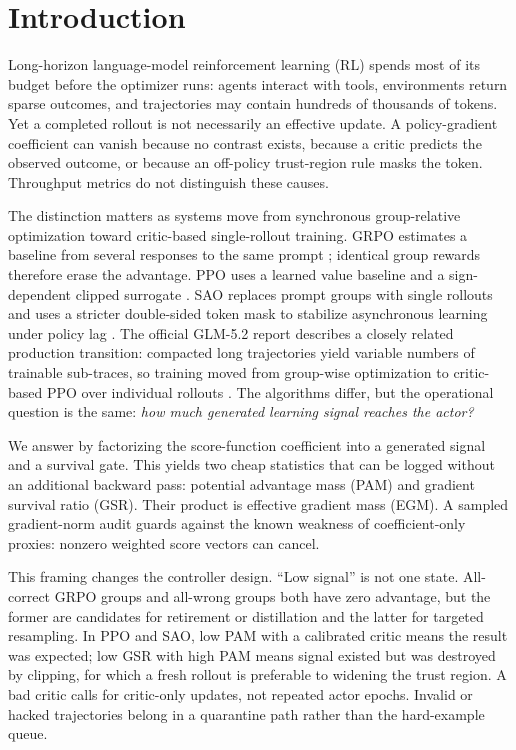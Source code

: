 \documentclass{article}
\begin{document}
\section{Introduction}

Long-horizon language-model reinforcement learning (RL) spends most of its
budget before the optimizer runs: agents interact with tools, environments
return sparse outcomes, and trajectories may contain hundreds of thousands of
tokens.  Yet a completed rollout is not necessarily an effective update.  A
policy-gradient coefficient can vanish because no contrast exists, because a
critic predicts the observed outcome, or because an off-policy trust-region
rule masks the token.  Throughput metrics do not distinguish these causes.

The distinction matters as systems move from synchronous group-relative
optimization toward critic-based single-rollout training.  GRPO estimates a
baseline from several responses to the same prompt \citep{shao2024deepseekmath};
identical group rewards therefore erase the advantage.  PPO uses a learned
value baseline and a sign-dependent clipped surrogate
\citep{schulman2017ppo}.  SAO replaces prompt groups with single rollouts and
uses a stricter double-sided token mask to stabilize asynchronous learning
under policy lag \citep{hou2026sao}.  The official GLM-5.2 report describes a
closely related production transition: compacted long trajectories yield
variable numbers of trainable sub-traces, so training moved from group-wise
optimization to critic-based PPO over individual rollouts
\citep{glm2026glm52}.  The algorithms differ, but the operational question is
the same: \emph{how much generated learning signal reaches the actor?}

We answer by factorizing the score-function coefficient into a generated
signal and a survival gate.  This yields two cheap statistics that can be
logged without an additional backward pass: potential advantage mass (PAM)
and gradient survival ratio (GSR).  Their product is effective gradient mass
(EGM).  A sampled gradient-norm audit guards against the known weakness of
coefficient-only proxies: nonzero weighted score vectors can cancel.

This framing changes the controller design.  ``Low signal'' is not one state.
All-correct GRPO groups and all-wrong groups both have zero advantage, but the
former are candidates for retirement or distillation and the latter for
targeted resampling.  In PPO and SAO, low PAM with a calibrated critic means
the result was expected; low GSR with high PAM means signal existed but was
destroyed by clipping, for which a fresh rollout is preferable to widening the
trust region.  A bad critic calls for critic-only updates, not repeated actor
epochs.  Invalid or hacked trajectories belong in a quarantine path rather
than the hard-example queue.
\end{document}
